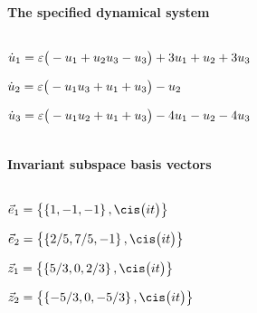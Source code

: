 
\(\)
\paragraph{The specified dynamical system}
\(
\)\par

\(\dot u_{1}=\varepsilon \big(-u\sb1+u\sb2 u\sb3-u\sb3\big)+3 u\sb1+u\sb2+3 u\sb3
\)\par

\(\dot u_{2}=\varepsilon \big(-u\sb1 u\sb3+u\sb1+u\sb3\big)-u\sb2
\)\par

\(\dot u_{3}=\varepsilon \big(-u\sb1 u\sb2+u\sb1+u\sb3\big)-4 u\sb1-u\sb2-4 u\sb3
\)\par

\(\)
\paragraph{Invariant subspace basis vectors}
\(
\)\par

\(\vec e_{1}=\left\{
\left\{
1 , -1 , -1
\right\} , \cis\big(i t\big)
\right\}
\)\par

\(\vec e_{2}=\left\{
\left\{
2/5 , 7/5 , -1
\right\} , \cis\big(i t\big)
\right\}
\)\par

\(\vec z_{1}=\left\{
\left\{
5/3 , 0 , 2/3
\right\} , \cis\big(i t\big)
\right\}
\)\par

\(\vec z_{2}=\left\{
\left\{
-5/3 , 0 , -5/3
\right\} , \cis\big(i t\big)
\right\}
\)\par
